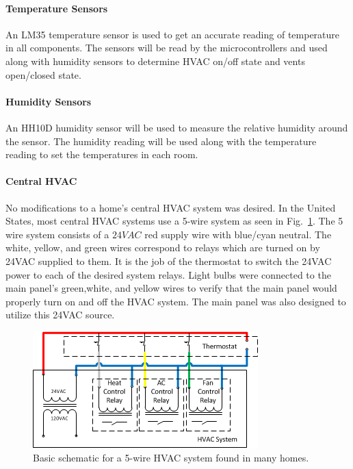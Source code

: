 \paragraph{Temperature Sensors}
\label{Temp Sensors}
An LM35 temperature sensor is used to get an accurate reading of temperature in all components. The sensors will be read by the microcontrollers and used along with humidity sensors to determine HVAC on/off state and vents open/closed state.
\paragraph{Humidity Sensors}
\label{humid_sensors}
An HH10D humidity sensor will be used to measure the relative humidity around the sensor.  The humidity reading will be used along with the temperature reading to set the temperatures in each room.

\paragraph{Central HVAC}
No modifications to a home's central HVAC system was desired. In the United States, most central HVAC systems use a 5-wire system as seen in Fig.~\ref{fig:5wire}.  The 5 wire system consists of a $24VAC$ red supply wire with blue/cyan neutral.  The white, yellow, and green wires correspond to relays which are turned on by 24VAC supplied to them. It is the job of the thermostat to switch the 24VAC power to each of the desired system relays.  Light bulbs were connected to the main panel's green,white, and yellow wires to verify that the main panel would properly turn on and off the HVAC system.  The main panel was also designed to utilize this 24VAC source.

\begin{figure}
\centering
\includegraphics[width=.99\textwidth]{5wire.png}
\caption{Basic schematic for a 5-wire HVAC system found in many homes.}
\label{fig:5wire}
\end{figure}

